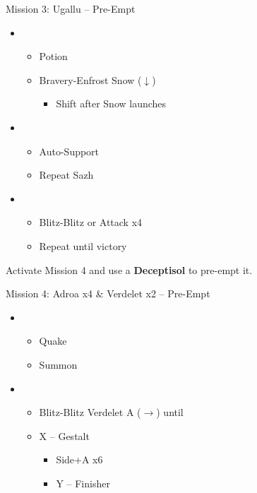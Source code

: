 \begin{battle}{Mission 3: Ugallu -- Pre-Empt}
	\begin{itemize}
		\item \third
			\begin{itemize}
				\item Potion
				\item Bravery-Enfrost Snow ($\downarrow$)
					\begin{itemize}
						\item Shift after Snow launches
					\end{itemize}
			\end{itemize}
		\item \fourth
			\begin{itemize}
				\item Auto-Support
				\item Repeat Sazh
			\end{itemize}
		\item \fifth
			\begin{itemize}
				\item Blitz-Blitz or Attack x4
				\item Repeat until victory
			\end{itemize}
	\end{itemize}
\end{battle}

Activate Mission 4 and use a \textbf{Deceptisol} to pre-empt it.

\begin{battle}{Mission 4: Adroa x4 \& Verdelet x2 -- Pre-Empt}
	\begin{itemize}
		\item \third
			\begin{itemize}
				\item Quake
				\item Summon
			\end{itemize}
		\item \fifth
			\begin{itemize}
				\item Blitz-Blitz Verdelet A ($\rightarrow$) until \stagger
				\item X -- Gestalt
					\begin{itemize}
						\item Side+A x6
						\item Y -- Finisher
					\end{itemize}
			\end{itemize}
	\end{itemize}
\end{battle}

